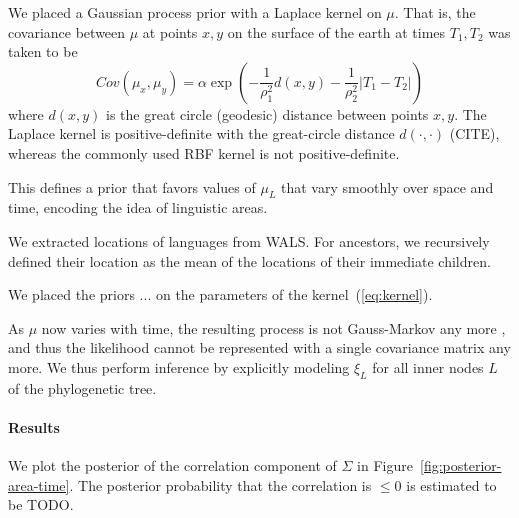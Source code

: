 \documentclass[11pt,a4paper]{article}
\begin{document}
We placed a Gaussian process prior with a Laplace kernel on $\mu$.
That is, the covariance between $\mu$ at points $x, y$ on the surface of the earth at times $T_1, T_2$ was taken to be
\begin{equation}\label{eq:kernel}
    Cov(\mu_x, \mu_y) = \alpha \exp\left(-\frac{1}{\rho^2_1} d(x,y) - \frac{1}{\rho_2^2} |T_1-T_2|\right)
\end{equation}
where $d(x,y)$ is the great circle (geodesic) distance between points $x, y$.
The Laplace kernel is positive-definite with the great-circle distance $d(\cdot, \cdot)$ (CITE), whereas the commonly used RBF kernel is not positive-definite.

This defines a prior that favors values of $\mu_L$ that vary smoothly over space and time, encoding the idea of linguistic areas.

We extracted locations of languages from WALS.
For ancestors, we recursively defined their location as the mean of the locations of their immediate children.

We placed the priors ... on the parameters of the kernel~(\ref{eq:kernel}).

As $\mu$ now varies with time, the resulting process is not Gauss-Markov any more \citep{schach1971weak}, and thus the likelihood cannot be represented with a single covariance matrix any more.
We thus perform inference by explicitly modeling $\xi_L$ for all inner nodes $L$ of the phylogenetic tree.



\paragraph{Results}
We plot the posterior of the correlation component of $\Sigma$ in Figure~\ref{fig:posterior-area-time}.
The posterior probability that the correlation is $\leq 0$ is estimated to be TODO.





\end{document}
